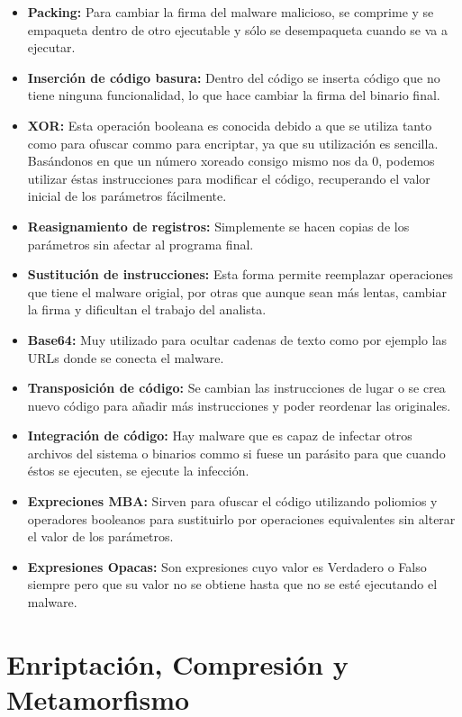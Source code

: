 \documentclass[a4paper]{article}
\begin{document}
	\begin{itemize}
		\item \textbf{Packing:} Para cambiar la firma del malware malicioso, se comprime y se empaqueta dentro de otro ejecutable y sólo se desempaqueta cuando se va a ejecutar.
		\item \textbf{Inserción de código basura:} Dentro del código se inserta código que no tiene ninguna funcionalidad, lo que hace cambiar la firma del binario final.
		\item \textbf{XOR:} Esta operación booleana es conocida debido a que se utiliza tanto como para ofuscar commo para encriptar, ya que su utilización es sencilla. Basándonos en que un número xoreado consigo mismo nos da 0, podemos utilizar éstas instrucciones para modificar el código, recuperando el valor inicial de los parámetros fácilmente.
		\item \textbf{Reasignamiento de registros:} Simplemente se hacen copias de los parámetros sin afectar al programa final.
		\item \textbf{Sustitución de instrucciones:} Esta forma permite reemplazar operaciones que tiene el malware origial, por otras que aunque sean más lentas, cambiar la firma y dificultan el trabajo del analista.
		\item \textbf{Base64:} Muy utilizado para ocultar cadenas de texto como por ejemplo las URLs donde se conecta el malware.
		\item \textbf{Transposición de código:} Se cambian las instrucciones de lugar o se crea nuevo código para añadir más instrucciones y poder reordenar las originales.
		\item \textbf{Integración de código:} Hay malware que es capaz de infectar otros archivos del sistema o binarios commo si fuese un parásito para que cuando éstos se ejecuten, se ejecute la infección.
		\item \textbf{Expreciones MBA:} Sirven para ofuscar el código utilizando poliomios y operadores booleanos para sustituirlo por operaciones equivalentes sin alterar el valor de los parámetros.
		\item \textbf{Expresiones Opacas:} Son expresiones cuyo valor es Verdadero o Falso siempre pero que su valor no se obtiene hasta que no se esté ejecutando el malware.
		
	\end{itemize}


	\section{Enriptación, Compresión y Metamorfismo}
	
\end{document}
